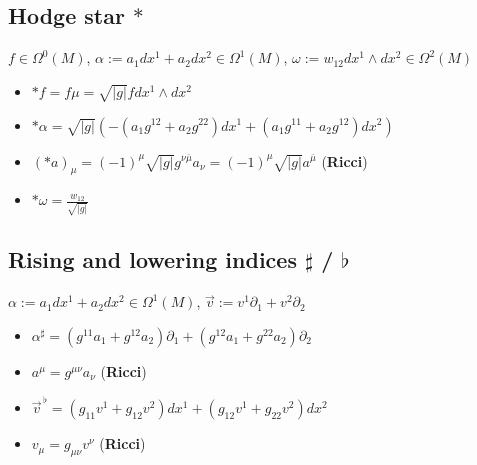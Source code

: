 \documentclass{scrartcl}
\newcommand{\vecflat}[1]{\vec{#1}^{\,\flat}}
\begin{document}
    \subsection{Hodge star \( * \)}
      \( f\in \Omega^{0}(M)\),
      \( \alpha:= a_{1}dx^{1} + a_{2}dx^{2} \in \Omega^{1}(M) \),
      \( \omega:= w_{12}dx^{1}\wedge dx^{2} \in \Omega^{2}(M) \)
      \begin{itemize}
        \item \( *f = f\mu = \sqrt{|g|}f dx^{1}\wedge dx^{2}\)
        \item \( *\alpha = \sqrt{|g|}\left( -\left( a_{1}g^{12} + a_{2}g^{22} \right)dx^{1} 
                                            +\left( a_{1}g^{11} + a_{2}g^{12} \right)dx^{2}\right) \)
        \item \( (*a)_{\mu} =  \left( -1 \right)^{\mu} \sqrt{|g|} g^{\nu\bar{\mu}}a_{\nu}
                          = \left( -1 \right)^{\mu} \sqrt{|g|} a^{\bar{\mu}}\)
                          (\textbf{Ricci})
        \item \( *\omega = \frac{w_{12}}{\sqrt{|g|}} \)
      \end{itemize}

    \subsection{Rising and lowering indices \( \sharp \) / \( \flat \)}
      \( \alpha:= a_{1}dx^{1} + a_{2}dx^{2} \in \Omega^{1}(M) \),
      \( \vec{v} := v^{1}\partial_{1} + v^{2}\partial_{2} \)
      \begin{itemize}
        \item \( \alpha^{\sharp} = \left( g^{11}a_{1}+g^{12}a_{2} \right)\partial_{1} + \left( g^{12}a_{1}+g^{22}a_{2} \right)\partial_{2}\)
        \item \( a^{\mu} = g^{\mu\nu}a_{\nu}\) (\textbf{Ricci})
        \item \( \vecflat{v} = \left( g_{11}v^{1} + g_{12}v^{2} \right)dx^{1} + \left( g_{12}v^{1} + g_{22}v^{2} \right)dx^{2} \)
        \item \( v_{\mu} = g_{\mu\nu}v^{\nu} \) (\textbf{Ricci})
      \end{itemize}
        
  
\end{document}
